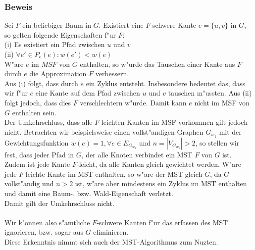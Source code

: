 \subsubsection{Beweis}
\label{sec:fProof}

Sei $F$ ein beliebiger Baum in $G$.
    Existiert eine $F$-schwere Kante $e=\{u, v\}$ in $G$, so gelten folgende 
    Eigenschaften f"ur $F$:\\
(i) Es existiert ein Pfad zwischen $u$ und $v$\\
(ii) $\forall e' \in P_e(e) : w(e') < w(e)$\\
W"are $e$ im $MSF$ von $G$ enthalten, so w"urde das Tauschen einer Kante aus
    $F$ durch $e$ die Approximation $F$ verbessern.\\
Aus (i) folgt, dass durch $e$ ein Zyklus entsteht. Insbesondere bedeutet das, 
    dass wir f"ur $e$ eine Kante auf dem Pfad zwischen $u$ und $v$ tauschen
    m"ussten.
    Aus (ii) folgt jedoch, dass dies $F$ verschlechtern w"urde.
    Damit kann $e$ nicht im MSF von $G$ enthalten sein.\\
Der Umkehrschluss, dass alle $F$-leichten Kanten im MSF vorkommen gilt jedoch
    nicht.
    Betrachten wir beispielsweise einen vollst"andigen Graphen $G_{w_1}$ mit der 
    Gewichtungsfunktion $w(e) = 1, \forall e \in E_{G_{w_1}}$ und 
    $n = |V_{G_{w_1}}| > 2$, so stellen wir fest, dass jeder Pfad in $G$, der alle
    Knoten verbindet ein MST $F$ von $G$ ist.
    Zudem ist jede Kante $F$-leicht, da alle Kanten gleich gewichtet werden.
    W"are jede $F$-leichte Kante im MST enthalten, so w"are der MST gleich $G$,
    da $G$ vollst"andig und $n > 2$ ist, w"are aber mindestens ein Zyklus im 
    MST enthalten und damit eine Baum-, bzw. Wald-Eigenschaft verletzt.\\
    Damit gilt der Umkehrschluss nicht.\\
\\
Wir k"onnen also s"amtliche $F$-schwere Kanten f"ur das erfassen des MST 
    ignorieren, bzw. sogar aus $G$ eliminieren.\\
Diese Erkenntnis nimmt sich auch der MST-Algorithmus zum Nuzten.\\

